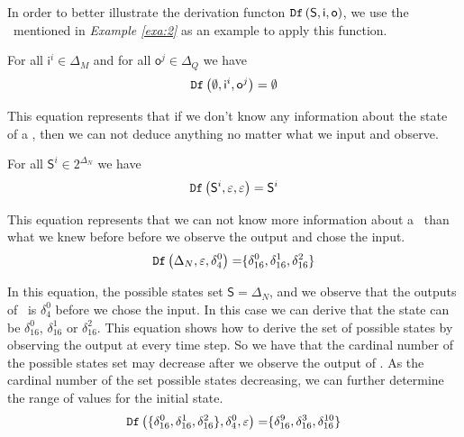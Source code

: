 \begin{example}
 In order to better illustrate the derivation functon ${\tt Df}\left( \mathsf{S},  \mathsf{i},  \mathsf{o}\right)$, we use the \BCN\ mentioned in {\em Example \ref{exa:2}} as an example to apply this function. 
 
 For all $\mathsf{i}^{i}\in \Delta_M$ and for all $\mathsf{o}^{j}\in \Delta_Q$ we have 
\begin{equation*}
\begin{split}
{\tt Df}\left(\emptyset,\mathsf{i}^{i},\mathsf{o}^{j}\right)=\emptyset\\
\end{split}
\label{equ:7}
\end{equation*}

This equation represents that 
if we don't know any information about the state of a \BCN, then we can not deduce anything no matter what we input and observe.

For all $\mathsf{S}^{i}\in 2^{\Delta_N}$ we have 
\begin{equation*}
\begin{split}
{\tt Df}\left(\mathsf{S}^{i},\varepsilon,\varepsilon\right)=\mathsf{S}^{i}\\
\end{split}
\label{equ:8}
\end{equation*}

 This equation represents that 
 we can not know more information about a \BCN\ than what we knew before before we observe the output and chose the input.
\begin{equation*}
\begin{split}
{\tt Df}\left(\Delta_N,\varepsilon,\delta_4^0\right)=&\{\delta_{16}^0,\delta_{16}^1,\delta_{16}^2\}\\
\end{split}
\label{equ:9}
\end{equation*}
 
In this equation, the possible states set $\mathsf{S}=\Delta_N$, and  we observe that the outputs of \BCN\ is $\delta_4^0$ before we chose the input. In this case we can derive that the state can be $\delta_{16}^0$, $\delta_{16}^1$ or  $\delta_{16}^2$. This equation shows how to derive the set of possible states by observing the output at every time step. So we have that the cardinal number of the possible states set may decrease after we observe the output of \BCN. As the cardinal number of the set possible states decreasing, we can further determine the range of values for the initial state. 
\begin{equation*}
\begin{split}
{\tt Df}\left(\{\delta_{16}^0,\delta_{16}^1,\delta_{16}^2\},\delta_4^0,\varepsilon\right)=&\{\delta_{16}^{9},\delta_{16}^3,\delta_{16}^{10}\}\\
\end{split}
\label{equ:10}
\end{equation*}


\end{example}
